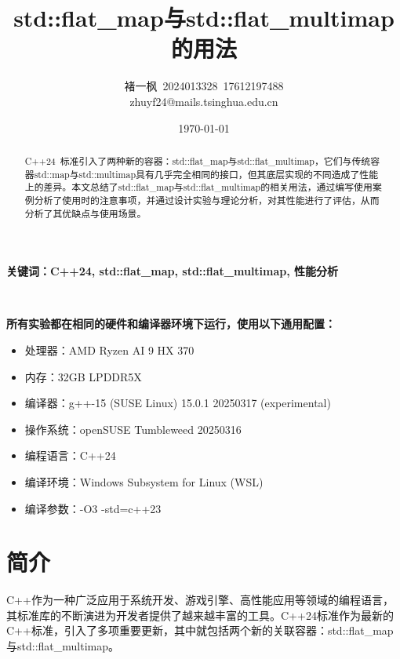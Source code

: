 \documentclass[a4paper, 12pt]{article}
\title{std::flat\_map与std::flat\_multimap的用法}
\author{褚一枫\ 2024013328\ 17612197488\\zhuyf24@mails.tsinghua.edu.cn}
\date{\today}
\begin{document}

\sloppy
\maketitle

\begin{abstract}
    C++24\ 标准引入了两种新的容器：std::flat\_map与std::flat\_multimap，它们与传统容器std::map与std::multimap具有几乎完全相同的接口，但其底层实现的不同造成了性能上的差异。本文总结了std::flat\_map与std::flat\_multimap的相关用法，通过编写使用案例分析了使用时的注意事项，并通过设计实验与理论分析，对其性能进行了评估，从而分析了其优缺点与使用场景。
\end{abstract}
\textbf{关键词：C++24, std::flat\_map, std::flat\_multimap, 性能分析}

~

\noindent\textbf{所有实验都在相同的硬件和编译器环境下运行，使用以下通用配置：}
\begin{itemize}
    \setlength{\itemsep}{0pt}
    \setlength{\parsep}{0pt}
    \setlength{\parskip}{0pt}
    \item 处理器：AMD Ryzen AI 9 HX 370 
    \item 内存：32GB LPDDR5X
    \item 编译器：g++-15 (SUSE Linux) 15.0.1 20250317 (experimental)
    \item 操作系统：openSUSE Tumbleweed 20250316
    \item 编程语言：C++24
    \item 编译环境：Windows Subsystem for Linux (WSL)
    \item 编译参数：-O3 -std=c++23
\end{itemize}


\clearpage

\tableofcontents

\clearpage
{}  %
\setcounter{page}{1}

\section{简介}

C++作为一种广泛应用于系统开发、游戏引擎、高性能应用等领域的编程语言，其标准库的不断演进为开发者提供了越来越丰富的工具。C++24标准作为最新的C++标准，引入了多项重要更新，其中就包括两个新的关联容器：std::flat\_map与std::flat\_multimap。
\end{document}
